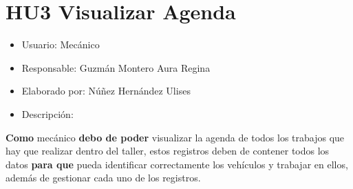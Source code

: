 \section{HU3 Visualizar Agenda}
\begin{itemize}
	\item Usuario: Mecánico
	\item Responsable: Guzmán Montero Aura Regina
	\item Elaborado por: Núñez Hernández Ulises
	\item Descripción:\\
\end{itemize}

\textbf{Como} mecánico \textbf{debo de poder} visualizar la agenda de todos los trabajos que hay que realizar dentro del taller, estos registros deben de contener todos los datos \textbf{para que} pueda identificar correctamente los vehículos y trabajar en ellos, además de gestionar cada uno de los registros.